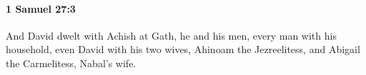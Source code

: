 
		\paragraph{1 Samuel 27:3} %
			\label{1SAMUEL-27-3}

			And David dwelt with Achish at Gath, he and his men, every man with his household, even David with his two wives, Ahinoam the Jezreelitess, and Abigail the Carmelitess, Nabal’s wife.


